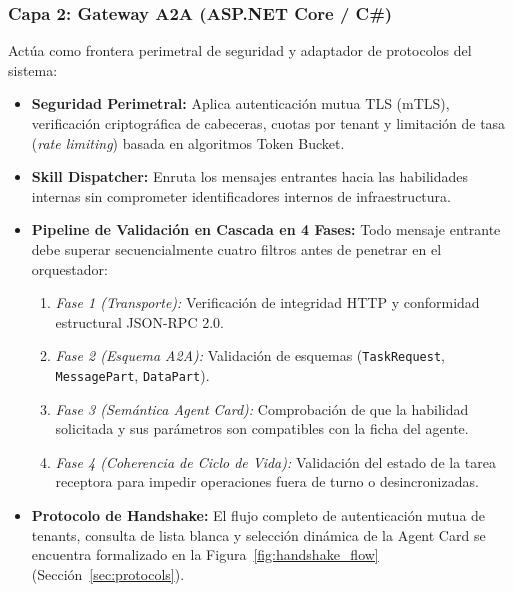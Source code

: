 \subsubsection{Capa 2: Gateway A2A (ASP.NET Core / C\#)}
Actúa como frontera perimetral de seguridad y adaptador de protocolos del sistema:
\begin{itemize}
    \item \textbf{Seguridad Perimetral:} Aplica autenticación mutua TLS (mTLS), verificación criptográfica de cabeceras, cuotas por tenant y limitación de tasa (\textit{rate limiting}) basada en algoritmos Token Bucket.
    \item \textbf{Skill Dispatcher:} Enruta los mensajes entrantes hacia las habilidades internas sin comprometer identificadores internos de infraestructura.
    \item \textbf{Pipeline de Validación en Cascada en 4 Fases:} Todo mensaje entrante debe superar secuencialmente cuatro filtros antes de penetrar en el orquestador:
    \begin{enumerate}
        \item \textit{Fase 1 (Transporte):} Verificación de integridad HTTP y conformidad estructural JSON-RPC 2.0.
        \item \textit{Fase 2 (Esquema A2A):} Validación de esquemas (\texttt{TaskRequest}, \texttt{MessagePart}, \texttt{DataPart}).
        \item \textit{Fase 3 (Semántica Agent Card):} Comprobación de que la habilidad solicitada y sus parámetros son compatibles con la ficha del agente.
        \item \textit{Fase 4 (Coherencia de Ciclo de Vida):} Validación del estado de la tarea receptora para impedir operaciones fuera de turno o desincronizadas.
    \end{enumerate}
    \item \textbf{Protocolo de Handshake:} El flujo completo de autenticación mutua de tenants, consulta de lista blanca y selección dinámica de la Agent Card se encuentra formalizado en la Figura~\ref{fig:handshake_flow} (Sección~\ref{sec:protocols}).
\end{itemize}


